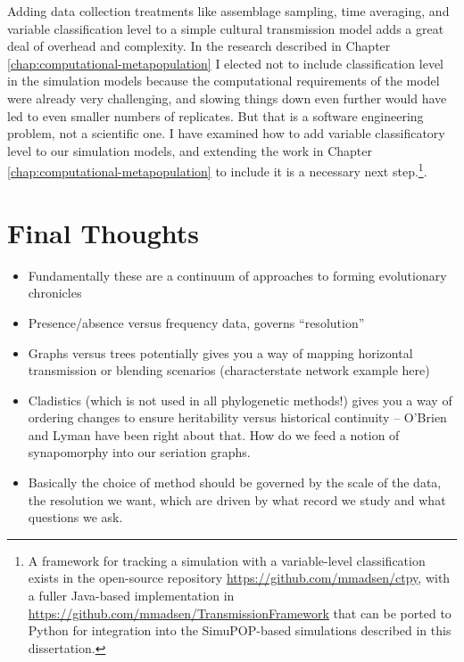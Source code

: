Adding data collection treatments like assemblage sampling, time averaging, and variable classification level to a simple cultural transmission model adds a great deal of overhead and complexity.  In the research described in Chapter \ref{chap:computational-metapopulation} I elected not to include classification level in the simulation models because the computational requirements of the model were already very challenging, and slowing things down even further would have led to even smaller numbers of replicates.  But that is a software engineering problem, not a scientific one.  I have examined how to add variable classificatory level to our simulation models, and extending the work in Chapter \ref{chap:computational-metapopulation} to include it is a necessary next step.\footnote{A framework for tracking a simulation with a variable-level classification exists in the open-source repository \url{https://github.com/mmadsen/ctpy}, with a fuller Java-based implementation in \url{https://github.com/mmadsen/TransmissionFramework} that can be ported to Python for integration into the SimuPOP-based simulations described in this dissertation.}.















\section{Final Thoughts}\label{conc:sec:final-thoughts}


\begin{itemize}
    \item Fundamentally these are a continuum of approaches to forming evolutionary chronicles
    \item Presence/absence versus frequency data, governs ``resolution''
    \item Graphs versus trees potentially gives you a way of mapping horizontal transmission or blending scenarios (characterstate network example here)
    \item Cladistics (which is not used in all phylogenetic methods!) gives you a way of ordering changes to ensure heritability versus historical continuity -- O'Brien and Lyman have been right about that.  How do we feed a notion of synapomorphy into our seriation graphs.  
    \item Basically the choice of method should be governed by the scale of the data, the resolution we want, which are driven by what record we study and what questions we ask.
\end{itemize}
 

